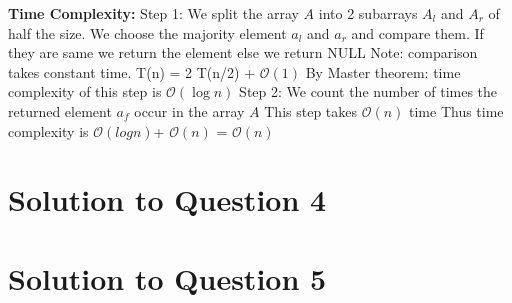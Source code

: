 \documentclass[11pt]{article}
\renewcommand{\O}{\mathcal{O}}
\begin{document}
{\bf Time Complexity:}\newline
Step 1: We split the array $A$ into 2 subarrays $A_l$ and $A_r$ of half the size. We choose the majority element $a_l$ and $a_r$
and compare them. If they are same we return the element else we return NULL\newline
Note: comparison takes constant time.\newline
T(n) = 2 T(n/2) + $\O(1)$ \newline
By Master theorem: time complexity of this step is $\O(\log n)$ \newline
Step 2: We count the number of times the returned element $a_f$ occur in the array $A$ \newline
This step takes $\O(n)$ time \newline
Thus time complexity is $\O(log n)$+ $\O(n)$ \newline
= $\O(n)$


\section{Solution to Question 4}



\section{Solution to Question 5}
\end{document}
